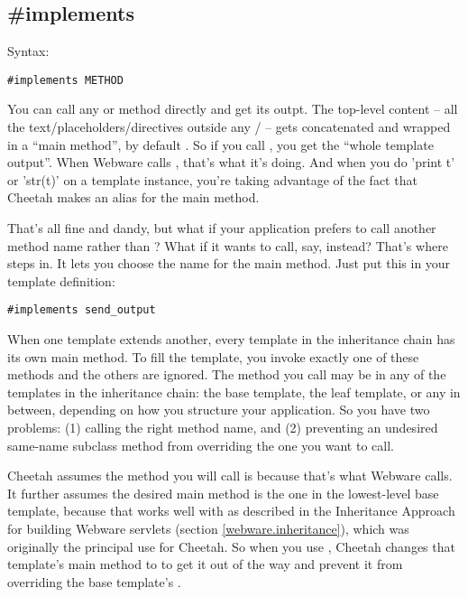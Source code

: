\subsection{\#implements}
\label{inheritanceEtc.implements}

Syntax:
\begin{verbatim}
#implements METHOD
\end{verbatim}

You can call any  or  method directly and get its
outpt.  The top-level content -- all the text/placeholders/directives outside any
/ -- gets concatenated and wrapped in a ``main
method'', by default .  So if you call , you
get the ``whole template output''.  When Webware calls ,
that's what it's doing.  And when you do 'print t' or 'str(t)' on a template
instance, you're taking advantage of the fact that Cheetah makes
 an alias for the main method.

That's all fine and dandy, but what if your application prefers to call another
method name rather than ?  What if it wants to call, say,
 instead?  That's where  steps in.  It
lets you choose the name for the main method.  Just put this in your template
definition:
\begin{verbatim}
#implements send_output
\end{verbatim}

When one template extends another, every template in the inheritance chain
has its own main method.  To fill the template, you invoke exactly one of
these methods and the others are ignored.  The method you call may be in any of
the templates in the inheritance chain: the base template, the leaf template,
or any in between, depending on how you structure your application.  So you
have two problems: (1) calling the right method name, and (2) preventing an
undesired same-name subclass method from overriding the one you want to call.  

Cheetah assumes the method you will call is  because
that's what Webware calls.  It further assumes the desired main method is the
one in the lowest-level base template, because that works well with
 as described in the Inheritance Approach for building Webware
servlets (section \ref{webware.inheritance}), which was originally the
principal use for Cheetah.  So when you use , Cheetah changes
that template's main method to  to get it out of the way and
prevent it from overriding the base template's .  

